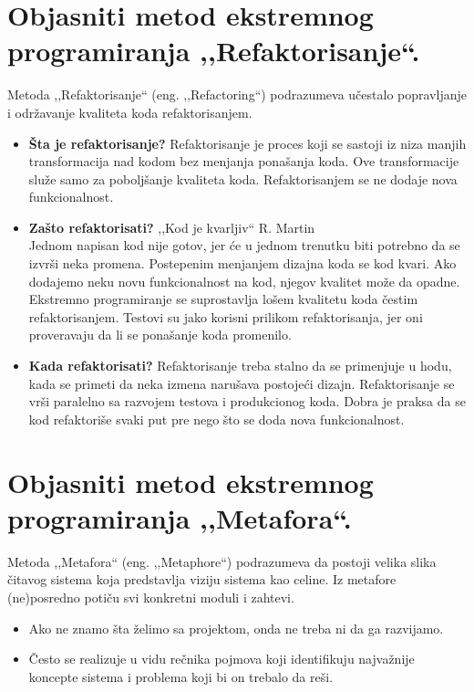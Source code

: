 \documentclass[a4paper]{article}
\begin{document}
\section{Objasniti metod ekstremnog programiranja ,,Refaktorisanje``.}
  Metoda ,,Refaktorisanje`` (eng. ,,Refactoring``) podrazumeva učestalo popravljanje i održavanje
  kvaliteta koda refaktorisanjem. 
  \begin{itemize}
    \item \textbf{Šta je refaktorisanje?} Refaktorisanje je proces koji se sastoji iz niza
          manjih transformacija nad kodom bez menjanja ponašanja koda. Ove transformacije
          služe samo za poboljšanje kvaliteta koda. Refaktorisanjem se ne dodaje nova funkcionalnost.
    \item \textbf{Zašto refaktorisati?} ,,Kod je kvarljiv`` R. Martin\\
          Jednom napisan kod nije gotov, jer će u jednom trenutku biti potrebno da se izvrši
          neka promena. Postepenim menjanjem dizajna koda se kod kvari. Ako dodajemo
          neku novu funkcionalnost na kod, njegov kvalitet može da opadne. Ekstremno
          programiranje se suprostavlja lošem kvalitetu koda čestim refaktorisanjem.
          Testovi su jako korisni prilikom refaktorisanja, jer oni proveravaju da li se
          ponašanje koda promenilo.
    \item \textbf{Kada refaktorisati?} Refaktorisanje treba stalno da se primenjuje u hodu,
          kada se primeti da neka izmena narušava postojeći dizajn. Refaktorisanje se 
          vrši paralelno sa razvojem testova i produkcionog koda. Dobra je praksa da se 
          kod refaktoriše svaki put pre nego što se doda nova funkcionalnost. 
  \end{itemize}

\section{Objasniti metod ekstremnog programiranja ,,Metafora``.}
  Metoda ,,Metafora`` (eng. ,,Metaphore``) podrazumeva da postoji velika slika čitavog sistema
  koja predstavlja viziju sistema kao celine. Iz metafore (ne)posredno potiču svi konkretni moduli
  i zahtevi. \\
  \begin{itemize}
    \item Ako ne znamo šta želimo sa projektom, onda ne treba ni da ga razvijamo. 
    \item Često se realizuje u vidu rečnika pojmova koji identifikuju najvažnije koncepte sistema 
          i problema koji bi on trebalo da reši.
  \end{itemize}
\end{document}
